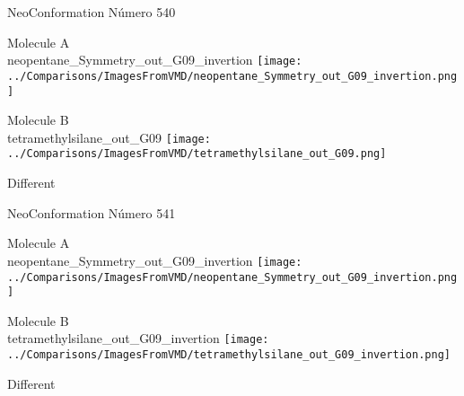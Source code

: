 \vtab[-3cm]
\begin{center}
{\large NeoConformation \tab Número 540}
\end{center}
\begin{multicols}{2}
\begin{center}
Molecule A \\ 
neopentane\_Symmetry\_out\_G09\_invertion
\texttt{[image: ../Comparisons/ImagesFromVMD/neopentane\_Symmetry\_out\_G09\_invertion.png]}
\\
\vtab

\columnbreak
Molecule B \\ 
tetramethylsilane\_out\_G09
\texttt{[image: ../Comparisons/ImagesFromVMD/tetramethylsilane\_out\_G09.png]}
\\
\vtab


\end{center}
\end{multicols}
\begin{center}
\textcolor{NavyBlue}{\Large Different}
\end{center}

 \newpage

\vtab[-3cm]
\begin{center}
{\large NeoConformation \tab Número 541}
\end{center}
\begin{multicols}{2}
\begin{center}
Molecule A \\ 
neopentane\_Symmetry\_out\_G09\_invertion
\texttt{[image: ../Comparisons/ImagesFromVMD/neopentane\_Symmetry\_out\_G09\_invertion.png]}
\\
\vtab

\columnbreak
Molecule B \\ 
tetramethylsilane\_out\_G09\_invertion
\texttt{[image: ../Comparisons/ImagesFromVMD/tetramethylsilane\_out\_G09\_invertion.png]}
\\
\vtab


\end{center}
\end{multicols}
\begin{center}
\textcolor{NavyBlue}{\Large Different}
\end{center}

 \newpage

